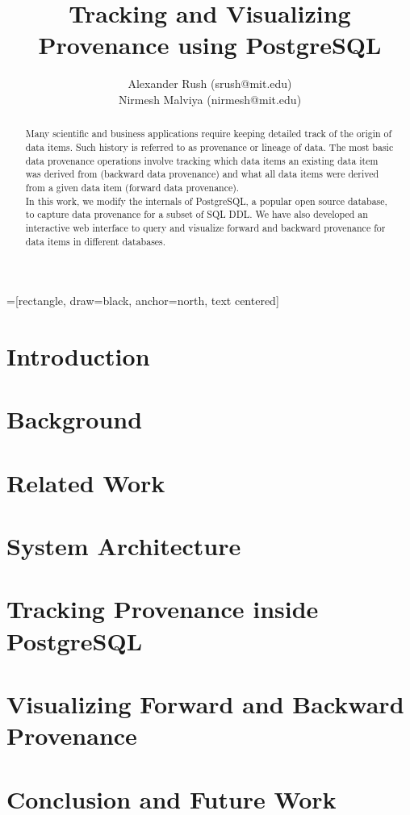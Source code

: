\documentclass[11pt]{article}
\title{Tracking and Visualizing Provenance using PostgreSQL}
\author{Alexander Rush (srush@mit.edu)\\ Nirmesh Malviya (nirmesh@mit.edu)}
\begin{document}
=[rectangle, draw=black, anchor=north, text centered]
\maketitle

\begin{abstract}
Many scientific and business applications require keeping detailed track of the origin of data items. Such history is referred to as provenance or lineage of data. The most basic data provenance operations involve tracking which data items an existing data item was derived from (backward data provenance) and what all data items were derived from a given data item (forward data provenance). \\

In this work, we modify the internals of PostgreSQL, a popular open source database, to capture data provenance for a subset of SQL DDL. We have also developed an interactive web interface to query and visualize forward and backward provenance for data items in different databases.
\end{abstract}

\section{Introduction}


\section{Background}


\section{Related Work}


\section{System Architecture}




\section{Tracking Provenance inside PostgreSQL}




\section{Visualizing Forward and Backward Provenance}





\section{Conclusion and Future Work}





\end{document}
